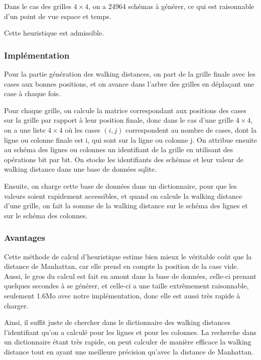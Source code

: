 \documentclass[a4paper, 12pt]{article}
\begin{document}
    Dans le cas des grilles $4 \times 4$, on a 24964 schémas à générer, ce qui est raisonnable d'un point de vue espace et temps.

    Cette heuristique est admissible.
    
    \subsubsection{Implémentation}

    Pour la partie génération des walking distances, on part de la grille finale avec les cases aux bonnes positions, et on avance dans l'arbre des grilles en déplaçant une case à chaque fois.
    
    Pour chaque grille, on calcule la matrice correspondant aux positions des cases sur la grille par rapport à leur position finale, donc dans le cas d'une grille $4 \times 4$, on a une liste $4 \times 4$ où les cases $(i, j)$ correspondent au nombre de cases, dont la ligne ou colonne finale est i, qui sont sur la ligne ou colonne j. 
    On attribue ensuite au schéma des lignes ou colonnes un identifiant de la grille en utilisant des opérations bit par bit.
    On stocke les identifiants des schémas et leur valeur de walking distance dans une base de données sqlite.
    
    Ensuite, on charge cette base de données dans un dictionnaire, pour que les valeurs soient rapidement accessibles, et quand on calcule la walking distance d'une grille, on fait la somme de la walking distance sur le schéma des lignes et sur le schéma des colonnes.
    
    \subsubsection{Avantages}

    Cette méthode de calcul d'heuristique estime bien mieux le véritable coût que la distance de Manhattan, car elle prend en compte la position de la case vide. Aussi, le gros du calcul est fait en amont dans la base de données, celle-ci prenant quelques secondes à se générer, et celle-ci a une taille extrêmement raisonnable, seulement 1.6Mo avec notre implémentation, donc elle est aussi très rapide à charger.

    Ainsi, il suffit juste de chercher dans le dictionnaire des walking distances l'identifiant qu'on a calculé pour les lignes et pour les colonnes.
    La recherche dans un dictionnaire étant très rapide, on peut calculer de manière efficace la walking distance tout en ayant une meilleure précision qu'avec la distance de Manhattan.
\end{document}
